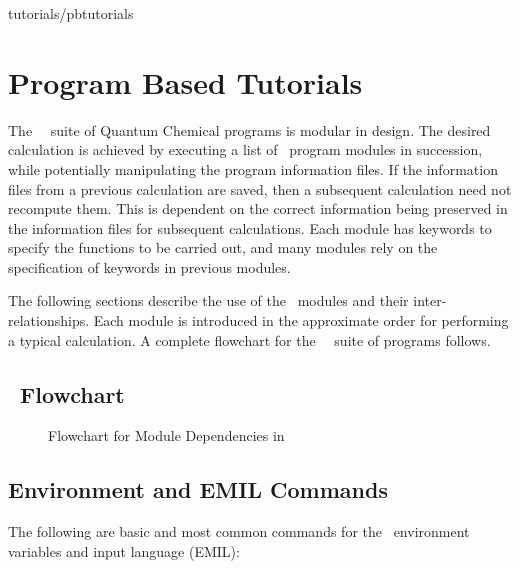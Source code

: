 
 {tutorials/pbtutorials}

\chapter{Program Based Tutorials}
\label{TUT:sec:pg-based-tut}

The \molcas\ \molcasversion\ suite of Quantum Chemical programs is modular in
design.  The desired calculation is achieved by executing a list of
\molcas\ program modules in succession, while potentially manipulating
the program information files. If the information files from a previous
calculation are saved, then a subsequent calculation need not recompute
them.  This is dependent on the correct information being preserved in
the information files for subsequent calculations.
Each module has keywords to specify the
functions to be carried out, and many modules rely on the
specification of keywords in previous modules.

The following sections describe the use of the \molcas\ modules and
their inter-relationships.  Each module is introduced in the
approximate order for performing a typical calculation.
A complete flowchart for the \molcas\ \molcasversion\ suite of programs follows.

\clearpage
\section{\molcasversion\ Flowchart}
\label{TUT:sec:flow_all}
\begin{figure}[hbt]
\leavevmode
{}
\caption{Flowchart for Module Dependencies in \molcas }
\label{fig:flow_all}
\end{figure}

\section{Environment and EMIL Commands}

The following are basic and most common commands for the \molcas\ environment variables and input language (EMIL):

